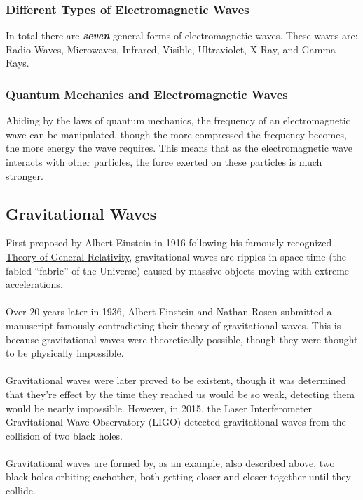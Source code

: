 \documentclass{article}
\begin{document}
\subsubsection{Different Types of Electromagnetic Waves}
In total there are \textbf{\textit{seven}} general forms of electromagnetic waves. These waves are: Radio Waves, Microwaves, Infrared, Visible, Ultraviolet, X-Ray, and Gamma Rays.

\subsubsection{Quantum Mechanics and Electromagnetic Waves}
Abiding by the laws of quantum mechanics, the frequency of an electromagnetic wave can be manipulated, though the more compressed the frequency becomes, the more energy the wave requires. This means that as the electromagnetic wave interacts with other particles, the force exerted on these particles is much stronger.

\subsection{Gravitational Waves}
First proposed by Albert Einstein in 1916 following his famously recognized \hyperref[sec:generalrelativity]{Theory of General Relativity}, gravitational waves are ripples in space-time (the fabled “fabric” of the Universe) caused by massive objects moving with extreme accelerations.\\\\
Over 20 years later in 1936, Albert Einstein and Nathan Rosen submitted a manuscript famously contradicting their theory of gravitational waves. This is because gravitational waves were theoretically possible, though they were thought to be physically impossible. \\\\
Gravitational waves were later proved to be existent, though it was determined that they're effect by the time they reached us would be so weak, detecting them would be nearly impossible. However, in 2015, the Laser Interferometer Gravitational-Wave Observatory (LIGO) detected gravitational waves from the collision of two black holes.\\\\
Gravitational waves are formed by, as an example, also described above, two black holes orbiting eachother, both getting closer and closer together until they collide.
\end{document}
